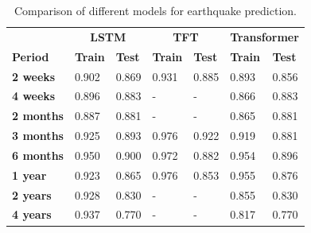 \begin{small}
    \begin{table}
        \caption{Comparison of different models for earthquake prediction.}
        \label{tab:eq-results}
        \begin{center}
        \begin{tabular}{p{2cm}|p{1cm}p{1cm}|p{1cm}p{1cm}|p{1cm}p{1cm}}
        \hline
        \textbf{ }      &  \multicolumn{2}{|c|}{\bf LSTM} & \multicolumn{2}{|c|}{\bf TFT} & \multicolumn{2}{|c}{\bf Transformer}\\
        \textbf{Period} & {\bf Train} & {\bf Test} & {\bf Train} & {\bf Test} & {\bf Train} & {\bf Test}
        \\
        \hline
        \textbf{2 weeks}  & 0.902 & 0.869	& 	0.931	& 	0.885	&	0.893	&	0.856\\
        \textbf{4 weeks}  & 0.896 & 0.883	& 	-		& 	-		&	0.866	&	0.883\\
        \textbf{2 months} & 0.887 & 0.881	& 	-		& 	-		&	0.865	&	0.881\\
        \textbf{3 months} & 0.925 & 0.893	& 	0.976	& 	0.922	&	0.919	&	0.881\\
        \textbf{6 months} & 0.950 & 0.900	& 	0.972	& 	0.882	&	0.954	&	0.896\\
        \textbf{1 year}   & 0.923 & 0.865	& 	0.976	& 	0.853	&	0.955	&	0.876\\
        \textbf{2 years}  & 0.928 & 0.830	& 	-		& 	-		&	0.855	&	0.830\\
        \textbf{4 years}  & 0.937 & 0.770	& 	-		& 	-		&	0.817	&	0.770\\
        \hline
        \end{tabular}
        \end{center}
    \end{table}
    \end{small}

